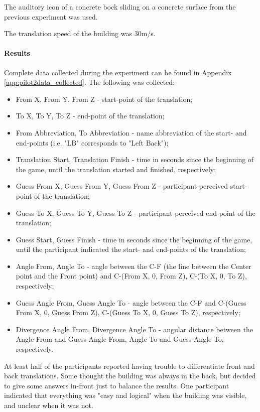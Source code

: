 The auditory icon of a concrete bock sliding on a concrete surface from the previous experiment was used. 

The translation speed of the building was 30m/s.

\paragraph{Results}
Complete data collected during the experiment can be found in Appendix \ref{app:pilot2data_collected}.
The following was collected:
\begin{itemize}
	\item From X, From Y, From Z - start-point of the translation;
	\item To X, To Y, To Z - end-point of the translation;
	\item From Abbreviation, To Abbreviation - name abbreviation of the start- and end-points (i.e. "LB" corresponds to "Left Back");
	\item Translation Start, Translation Finish - time in seconds since the beginning of the game, until the translation started and finished, respectively;
	\item Guess From X, Guess From Y, Guess From Z - participant-perceived start-point of the translation;
	\item Guess To X, Guess To Y, Guess To Z - participant-perceived end-point of the translation;
	\item Guess Start, Guess Finish - time in seconds since the beginning of the game, until the participant indicated the start- and end-points of the translation;
	\item Angle From, Angle To - angle between the C-F (the line between the Center point and the Front point) and C-(From X, 0, From Z), C-(To X, 0, To Z), respectively;
	\item Guess Angle From, Guess Angle To - angle between the C-F and C-(Guess From X, 0, Guess From Z), C-(Guess To X, 0, Guess To Z), respectively;
	\item Divergence Angle From, Divergence Angle To - angular distance between the Angle From and Guess Angle From, Angle To and Guess Angle To, respectively.
\end{itemize}

At least half of the participants reported having trouble to differentiate front and back translations. Some thought the building was always in the back, but decided to give some answers in-front just to balance the results. One participant indicated that everything was "easy and logical" when the building was visible, and unclear when it was not.

